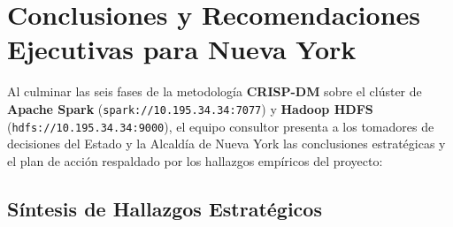 \documentclass[11pt,a4paper]{article}
\begin{document}


\section{Conclusiones y Recomendaciones Ejecutivas para Nueva York}
\label{sec:conclusiones_recomendaciones}

Al culminar las seis fases de la metodología \textbf{CRISP-DM} sobre el clúster de \textbf{Apache Spark} (\texttt{spark://10.195.34.34:7077}) y \textbf{Hadoop HDFS} (\texttt{hdfs://10.195.34.34:9000}), el equipo consultor presenta a los tomadores de decisiones del Estado y la Alcaldía de Nueva York las conclusiones estratégicas y el plan de acción respaldado por los hallazgos empíricos del proyecto:

\subsection{Síntesis de Hallazgos Estratégicos}
\end{document}

